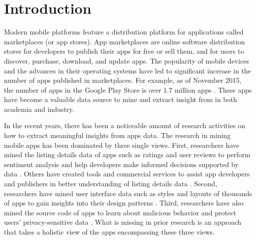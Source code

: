 \chapter{Introduction}
\label{ch:intro__chapter}
Modern mobile platforms feature a distribution platform for applications called marketplaces (or app stores).
App marketplaces are online software distribution stores for developers to publish their apps for free or sell them, and for users to discover, purchase, download, and update apps.
The popularity of mobile devices and the advances in their operating systems have led to significant increase in the number of apps published in marketplaces.
For example, as of November 2015, the number of apps in the Google Play Store is over 1.7 million apps \cite{appbrain_play_apps}.
These apps have become a valuable data source to mine and extract insight from in both academia and industry.

In the recent years, there has been a noticeable amount of research activities on how to extract meaningful insights from apps data. 
The research in mining mobile apps has been dominated by three single views.
First, researchers have mined the listing details data of apps such as ratings and user reviews to perform sentiment analysis and help developers make informed decisions supported by data \cite{fu_2013_KDD,chen_2014_ICSE,kong_2015_CCS}. 
Others have created tools and commercial services to assist app developers and publishers in better understanding of listing details data \cite{appfigures,applause,appannie}.
Second, researchers have mined user interface data such as styles and layouts of thousands of apps to gain insights into their design patterns \cite{shirazi_EICS_2013,Alharbi_2015_MobileHCI}.
Third, researchers have also mined the source code of apps to learn about malicious behavior and protect users' privacy-sensitive data \cite{zhou_2012_SP_dissecting,lu_2012_CCS,Arzt_2014_PLDI}.
What is missing in prior research is an approach that takes a holistic view of the apps encompassing these three views. 

